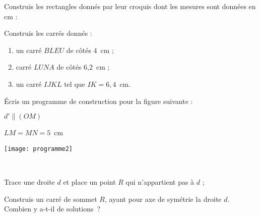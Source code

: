 \begin{exercice}
Construis les rectangles donnés par leur croquis dont les mesures sont données en cm :
\begin{colenumerate}{2}
 \item
 
  
  \item
 
   
  \item
 
   
  \item
 
   
 \end{colenumerate}
\end{exercice}







\begin{exercice}
Construis les carrés donnés :
\begin{enumerate}
 \item un carré $BLEU$ de côtés 4 cm ;
 \item carré $LUNA$ de côtés 6,2 cm ;
 \item un carré $IJKL$ tel que $IK = 6,4$ cm.
 \end{enumerate} 
\end{exercice}


\begin{exercice}
Écris un programme de construction pour la figure suivante :

\begin{minipage}[c]{0.46\linewidth}
$d' \parallel (OM)$

$LM = MN = 5$ cm
 \end{minipage} \hfill%
 \begin{minipage}[c]{0.46\linewidth}
  \texttt{[image: programme2]}
  \end{minipage} \\
\end{exercice}


\begin{exercice}
Trace une droite $d$ et place un point $R$ qui n'appartient pas à $d$ ;

Construis un carré de sommet $R$, ayant pour axe de symétrie la droite $d$. Combien y a‑t‑il de solutions ?

\end{exercice}


